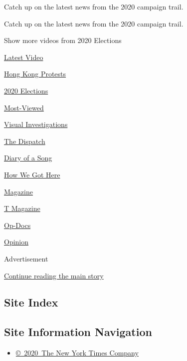Catch up on the latest news from the 2020 campaign trail.

Catch up on the latest news from the 2020 campaign trail.

Show more videos from 2020 Elections

\href{/video}{}

\href{/video/latest-video}{Latest Video}

\href{/video/hk-protest}{Hong Kong Protests}

\href{/video/2020-Elections}{2020 Elections}

\href{/video/Most-Viewed}{Most-Viewed}

\href{/video/investigations}{Visual Investigations}

\href{/video/on-the-ground}{The Dispatch}

\href{/video/diaryofasong}{Diary of a Song}

\href{/video/how-we-got-here}{How We Got Here}

\href{/video/magazine}{Magazine}

\href{/video/t-magazine}{T Magazine}

\href{/video/op-docs}{Op-Docs}

\href{/video/opinion}{Opinion}

Advertisement

\protect\hyperlink{after-bottom}{Continue reading the main story}

\hypertarget{site-index}{%
\subsection{Site Index}\label{site-index}}

\hypertarget{site-information-navigation}{%
\subsection{Site Information
Navigation}\label{site-information-navigation}}

\begin{itemize}
\tightlist
\item
  \href{https://help.nytimes3xbfgragh.onion/hc/en-us/articles/115014792127-Copyright-notice}{©~2020~The
  New York Times Company}
\end{itemize}

